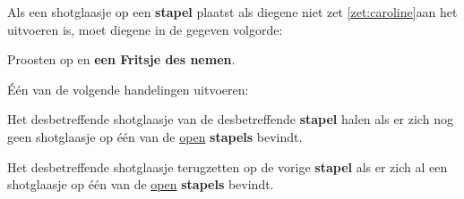 \vervolgLijst{}
\item Als \eenSpeler een shotglaasje op een \textbf{stapel} plaatst als diegene niet zet \ref{zet:caroline}\footnotemark[1] aan het uitvoeren is, moet diegene in de gegeven volgorde:
\puntLijst{}
\item Proosten op  en \textbf{een Fritsje des nemen}\footnotemark[2].
\item Één van de volgende handelingen uitvoeren:
\numeriekeLijst{}
\item Het desbetreffende shotglaasje van de desbetreffende \textbf{stapel} halen als er zich nog geen shotglaasje op \'e\'en van de \ul{open} \textbf{stapels} bevindt.
\item Het desbetreffende shotglaasje terugzetten op de vorige \textbf{stapel} als er zich al een shotglaasje op \'e\'en van de \ul{open} \textbf{stapels} bevindt.
\eindNumeriekeLijst{}
\eindPuntLijst{}
\eindLijst{}

\footnotetext[2]{\footnoteFritsjeDesNemen}

